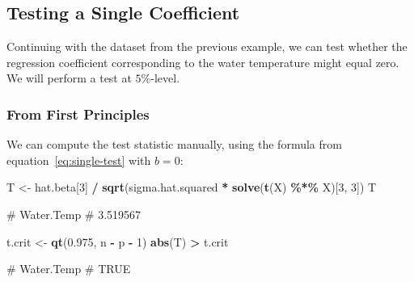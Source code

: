 \documentclass[
  a4paper,
]{article}
\newenvironment{Shaded}{\begin{snugshade}}{\end{snugshade}}
\newcommand{\DecValTok}[1]{\textcolor[rgb]{0.00,0.00,0.81}{#1}}
\newcommand{\FloatTok}[1]{\textcolor[rgb]{0.00,0.00,0.81}{#1}}
\newcommand{\FunctionTok}[1]{\textcolor[rgb]{0.13,0.29,0.53}{\textbf{#1}}}
\newcommand{\NormalTok}[1]{#1}
\newcommand{\OtherTok}[1]{\textcolor[rgb]{0.56,0.35,0.01}{#1}}
\newcommand{\SpecialCharTok}[1]{\textcolor[rgb]{0.81,0.36,0.00}{\textbf{#1}}}
\theoremstyle{definition}
\theoremstyle{definition}
\theoremstyle{definition}
\theoremstyle{definition}
\theoremstyle{remark}
\begin{document}
\subsection{Testing a Single Coefficient}\label{testing-a-single-coefficient}

Continuing with the dataset from the previous example, we can test whether the
regression coefficient corresponding to the water temperature might equal zero.
We will perform a test at \(5\%\)-level.

\subsubsection{From First Principles}\label{from-first-principles-1}

We can compute the test statistic manually, using the formula from
equation~\eqref{eq:single-test} with \(b = 0\):

\begin{Shaded}
\begin{Highlighting}[]
\NormalTok{T }\OtherTok{\textless{}{-}}\NormalTok{ hat.beta[}\DecValTok{3}\NormalTok{] }\SpecialCharTok{/} \FunctionTok{sqrt}\NormalTok{(sigma.hat.squared }\SpecialCharTok{*} \FunctionTok{solve}\NormalTok{(}\FunctionTok{t}\NormalTok{(X) }\SpecialCharTok{\%*\%}\NormalTok{ X)[}\DecValTok{3}\NormalTok{, }\DecValTok{3}\NormalTok{])}
\NormalTok{T}
\end{Highlighting}
\end{Shaded}

\begin{Shaded}
\begin{Highlighting}[]
\NormalTok{\# Water.Temp }
\NormalTok{\#   3.519567}
\end{Highlighting}
\end{Shaded}

\begin{Shaded}
\begin{Highlighting}[]
\NormalTok{t.crit }\OtherTok{\textless{}{-}} \FunctionTok{qt}\NormalTok{(}\FloatTok{0.975}\NormalTok{, n }\SpecialCharTok{{-}}\NormalTok{ p }\SpecialCharTok{{-}} \DecValTok{1}\NormalTok{)}
\FunctionTok{abs}\NormalTok{(T) }\SpecialCharTok{\textgreater{}}\NormalTok{ t.crit}
\end{Highlighting}
\end{Shaded}

\begin{Shaded}
\begin{Highlighting}[]
\NormalTok{\# Water.Temp }
\NormalTok{\#       TRUE}
\end{Highlighting}
\end{Shaded}
\end{document}
